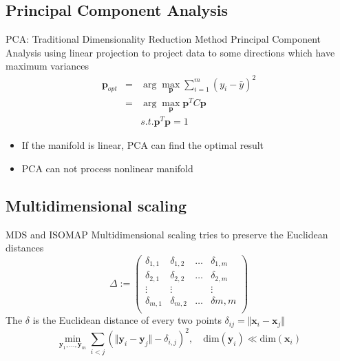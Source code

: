 \documentclass{beamer}
\newcommand{\bol}[1]{\textbf{#1}}
\begin{document}
\begin{darkframes}
    \subsection{Principal Component Analysis}
    \begin{frame}{PCA: Traditional Dimensionality Reduction Method}
    Principal Component Analysis using linear projection to project data to some directions which have maximum variances
  	\begin{eqnarray*}
  		\bol{p}_{opt} & = & \arg\max_{\bol{p}}\sum_{i = 1}^m(y_i - \bar{y})^2\\
  							& = & \arg\max_{\bol{p}}\bol{p}^TC\bol{p}\\
  							&    &  s.t. \bol{p}^T\bol{p} = 1
  	\end{eqnarray*}
  	\begin{itemize}
  		\item If the manifold is linear, PCA can find the optimal result
  		\item PCA can not process nonlinear manifold
  	\end{itemize}
    \end{frame}
    
    \subsection{Multidimensional scaling}
    \begin{frame}{MDS and ISOMAP}
    \alert{Multidimensional scaling} tries to preserve the Euclidean distances
    \begin{displaymath}
	\Delta :=
	\left( \begin{array}{cccc}
	\delta_{1,1} & \delta_{1,2} & \ldots & \delta_{1,m} \\
	\delta_{2,1} & \delta_{2,2} & \ldots & \delta_{2,m}\\
	\vdots & \vdots & &\vdots\\
	\delta_{m,1} & \delta_{m,2} &\ldots & \delta{m,m}\\
	\end{array} \right)
   \end{displaymath}
   The $\delta$ is the Euclidean distance of every two points $ \delta_{ij}=\Vert \textbf{x}_i - \textbf{x}_j \Vert$ 
   \[
     \min_{\textbf{y}_1,\ldots,\textbf{y}_m} \sum_{i<j}\left(\Vert \textbf{y}_i - \textbf{y}_j \Vert - 
     \delta_{i,j}\right)^2,\quad \textrm{dim}(\textbf{y}_i) \ll \textrm{dim}(\textbf{x}_i)
   \]
    \end{frame}
   

\end{darkframes}
\end{document}

